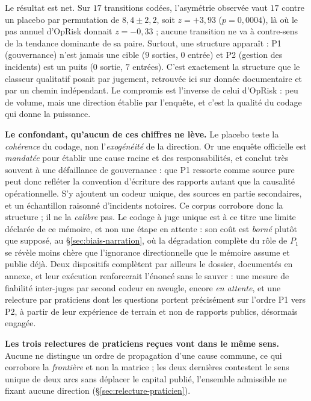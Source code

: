 Le résultat est net. Sur $17$ transitions codées, l'asymétrie observée vaut $17$ contre un
placebo par permutation de $8{,}4 \pm 2{,}2$, soit $z=+3{,}93$ ($p=0{,}0004$), là où le pas
annuel d'OpRisk donnait $z=-0{,}33$ ; aucune transition ne va à contre-sens de la
tendance dominante de sa paire. Surtout, une structure apparaît :
P1 (gouvernance) n'est jamais une cible ($9$ sorties, $0$ entrée) et P2
(gestion des incidents) est un puits ($0$ sortie, $7$ entrées). C'est exactement la structure
que le classeur qualitatif posait par jugement, retrouvée ici sur donnée documentaire et par un
chemin indépendant. Le compromis est l'inverse de celui d'OpRisk : peu de volume, mais une
direction établie par l'enquête, et c'est la qualité du codage qui donne la puissance.

\begin{attention}
\textbf{Le confondant, qu'aucun de ces chiffres ne lève.} Le placebo teste la \emph{cohérence}
du codage, non l'\emph{exogénéité} de la direction. Or une enquête officielle est \emph{mandatée}
pour établir une cause racine et des responsabilités, et conclut très souvent à une
\og{}défaillance de gouvernance\fg{} : que P1 ressorte comme source pure peut donc refléter la
convention d'écriture des rapports autant que la causalité opérationnelle. S'y ajoutent
un codeur unique, des sources en partie secondaires, et un échantillon raisonné d'incidents
notoires. Ce corpus corrobore donc la structure ; il ne la \emph{calibre} pas. Le
codage à juge unique est à ce titre une limite déclarée de ce mémoire, et non une étape
en attente : son coût est \emph{borné} plutôt que supposé, au \S\ref{sec:biais-narration}, où la
dégradation complète du rôle de $P_1$ se révèle moins chère que l'ignorance directionnelle que
le mémoire assume et publie déjà. Deux dispositifs complètent par ailleurs le dossier, documentés en annexe, et leur exécution
renforcerait l'énoncé sans le sauver : une mesure de fiabilité inter-juges par second
codeur en aveugle, encore \emph{en attente}, et une relecture par praticiens dont les
questions portent précisément sur l'ordre P1 vers P2, à partir de leur expérience de terrain et
non de rapports publics, désormais engagée.

\textbf{Les trois relectures de praticiens reçues vont dans le même sens.} Aucune ne distingue un
ordre de propagation d'une cause commune, ce qui corrobore la \emph{frontière} et non la matrice ;
les deux dernières contestent le sens unique de deux arcs sans déplacer le capital publié,
l'ensemble admissible ne fixant aucune direction (\S\ref{sec:relecture-praticien}).
\end{attention}

